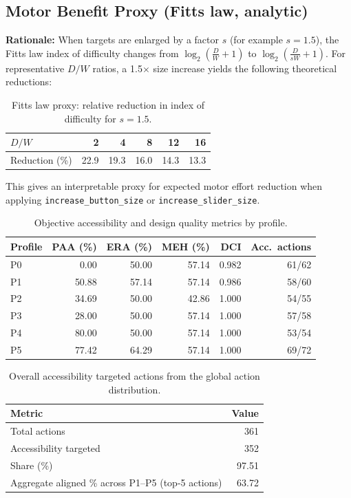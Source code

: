 \subsection{Motor Benefit Proxy (Fitts law, analytic)}
\textbf{Rationale:}
When targets are enlarged by a factor \(s\) (for example \(s{=}1.5\)), the Fitts law index of difficulty changes from \(\log_2(\frac{D}{W}+1)\) to \(\log_2(\frac{D}{sW}+1)\).
For representative \(D/W\) ratios, a 1.5\(\times\) size increase yields the following theoretical reductions:

\begin{table}[h]
\centering
\caption{Fitts law proxy: relative reduction in index of difficulty for \(s{=}1.5\).}
\begin{tabular}{lrrrrr}
\toprule
\(D/W\) & 2 & 4 & 8 & 12 & 16 \\
\midrule
Reduction (\%) & 22.9 & 19.3 & 16.0 & 14.3 & 13.3 \\
\bottomrule
\end{tabular}
\end{table}

This gives an interpretable proxy for expected motor effort reduction when applying \texttt{increase\_button\_size} or \texttt{increase\_slider\_size}.


\begin{table}[H]
\centering
\caption{Objective accessibility and design quality metrics by profile.}
\label{tab:obj-metrics}
\begin{tabular}{lrrrrr}
\toprule
\textbf{Profile} & \textbf{PAA (\%)} & \textbf{ERA (\%)} & \textbf{MEH (\%)} & \textbf{DCI} & \textbf{Acc.\ actions} \\
\midrule
P0 & 0.00 & 50.00 & 57.14 & 0.982 & 61/62 \\
P1 & 50.88 & 57.14 & 57.14 & 0.986 & 58/60 \\
P2 & 34.69 & 50.00 & 42.86 & 1.000 & 54/55 \\
P3 & 28.00 & 50.00 & 57.14 & 1.000 & 57/58 \\
P4 & 80.00 & 50.00 & 57.14 & 1.000 & 53/54 \\
P5 & 77.42 & 64.29 & 57.14 & 1.000 & 69/72 \\
\bottomrule
\end{tabular}
\end{table}

\begin{table}[H]
\centering
\caption{Overall accessibility targeted actions from the global action distribution.}
\label{tab:overall-accessible-share}
\begin{tabular}{lr}
\toprule
\textbf{Metric} & \textbf{Value} \\
\midrule
Total actions & 361 \\
Accessibility targeted & 352 \\
Share (\%) & 97.51 \\
\midrule
Aggregate aligned \% across P1--P5 (top-5 actions) & 63.72 \\
\bottomrule
\end{tabular}
\end{table}

